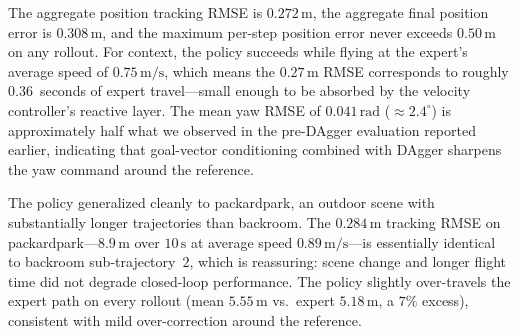 \documentclass[10pt,twocolumn,letterpaper]{article}
\begin{document}
The aggregate position tracking RMSE is $0.272\,\mathrm{m}$, the aggregate final position error is $0.308\,\mathrm{m}$, and the maximum per-step position error never exceeds $0.50\,\mathrm{m}$ on any rollout. For context, the policy succeeds while flying at the expert's average speed of $0.75\,\mathrm{m/s}$, which means the $0.27\,\mathrm{m}$ RMSE corresponds to roughly $0.36$~seconds of expert travel---small enough to be absorbed by the velocity controller's reactive layer. The mean yaw RMSE of $0.041\,\mathrm{rad}$ ($\approx 2.4^\circ$) is approximately half what we observed in the pre-DAgger evaluation reported earlier, indicating that goal-vector conditioning combined with DAgger sharpens the yaw command around the reference.

The policy generalized cleanly to packardpark, an outdoor scene with substantially longer trajectories than backroom. The $0.284\,\mathrm{m}$ tracking RMSE on packardpark---$8.9\,\mathrm{m}$ over $10\,\mathrm{s}$ at average speed $0.89\,\mathrm{m/s}$---is essentially identical to backroom sub-trajectory~$2$, which is reassuring: scene change and longer flight time did not degrade closed-loop performance. The policy slightly over-travels the expert path on every rollout (mean $5.55\,\mathrm{m}$ vs.~expert $5.18\,\mathrm{m}$, a $7\%$ excess), consistent with mild over-correction around the reference.
\end{document}
